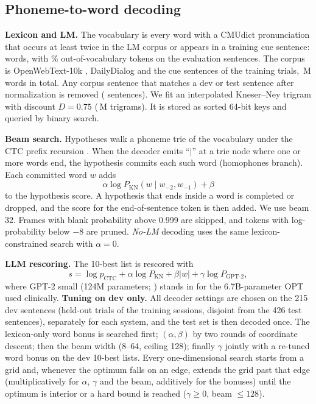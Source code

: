 \subsection{Phoneme-to-word decoding}
\textbf{Lexicon and LM.} The vocabulary is every word with a CMUdict pronunciation \citep{cmudict} that occurs at least twice in the LM corpus or appears in a training cue sentence: \LMVocab{} words, with \LMOOV\% out-of-vocabulary tokens on the evaluation sentences.
The corpus is OpenWebText-10k \citep{gokaslan2019openwebtext}, DailyDialog \citep{li2017dailydialog} and the cue sentences of the training trials, \LMWords\,M words in total. Any corpus sentence that matches a dev or test sentence after normalization is removed (\LMRemoved{} sentences).
We fit an interpolated Kneser--Ney trigram \citep{kneser1995improved,chen1999empirical} with discount $D{=}0.75$ (\LMTrigrams\,M trigrams). It is stored as sorted 64-bit keys and queried by binary search.

\textbf{Beam search.} Hypotheses walk a phoneme trie of the vocabulary under the CTC prefix recursion \citep{hannun2014firstpass}. When the decoder emits ``$|$'' at a trie node where one or more words end, the hypothesis commits each such word (homophones branch). Each committed word $w$ adds
\begin{equation}
\alpha\log P_{\text{KN}}(w\mid w_{-2},w_{-1})+\beta
\end{equation}
to the hypothesis score. A hypothesis that ends inside a word is completed or dropped, and the score for the end-of-sentence token is then added. We use beam 32. Frames with blank probability above 0.999 are skipped, and tokens with log-probability below $-8$ are pruned.
\emph{No-LM} decoding uses the same lexicon-constrained search with $\alpha{=}0$.

\textbf{LLM rescoring.} The 10-best list is rescored with
\begin{equation}
s=\log p_{\text{CTC}}+\alpha\log P_{\text{KN}}+\beta|w|+\gamma\log P_{\text{GPT-2}},
\end{equation}
where GPT-2 small (124M parameters; \citealp{radford2019gpt2}) stands in for the 6.7B-parameter OPT used clinically.
\textbf{Tuning on dev only.} All decoder settings are chosen on the 215 dev sentences (held-out trials of the training sessions, disjoint from the 426 test sentences), separately for each system, and the test set is then decoded once. The lexicon-only word bonus is searched first; $(\alpha,\beta)$ by two rounds of coordinate descent; then the beam width (8--64, ceiling 128); finally $\gamma$ jointly with a re-tuned word bonus on the dev 10-best lists. Every one-dimensional search starts from a grid and, whenever the optimum falls on an edge, extends the grid past that edge (multiplicatively for $\alpha$, $\gamma$ and the beam, additively for the bonuses) until the optimum is interior or a hard bound is reached ($\gamma\ge0$, beam $\le128$).

